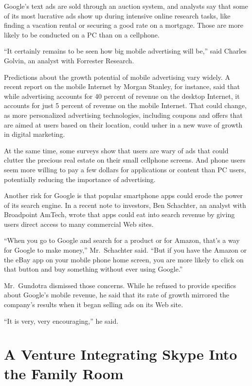 ﻿\documentclass[12pt]{article}
\begin{document}
Google's text ads are sold through an auction system, and analysts say that some of its most
lucrative ads show up during intensive online research tasks, like finding a vacation rental or
securing a good rate on a mortgage. Those are more likely to be conducted on a PC than on a
cellphone.

``It certainly remains to be seen how big mobile advertising will be,'' said Charles Golvin, an
analyst with Forrester Research.

Predictions about the growth potential of mobile advertising vary widely. A recent report on the
mobile Internet by Morgan Stanley, for instance, said that while advertising accounts for 40 percent
of revenue on the desktop Internet, it accounts for just 5 percent of revenue on the mobile
Internet. That could change, as more personalized advertising technologies, including coupons and
offers that are aimed at users based on their location, could usher in a new wave of growth in
digital marketing.

At the same time, some surveys show that users are wary of ads that could clutter the precious real
estate on their small cellphone screens. And phone users seem more willing to pay a few dollars for
applications or content than PC users, potentially reducing the importance of advertising.

Another risk for Google is that popular smartphone apps could erode the power of its search engine.
In a recent note to investors, Ben Schachter, an analyst with Broadpoint AmTech, wrote that apps
could eat into search revenue by giving users direct access to many commercial Web sites.

``When you go to Google and search for a product or for Amazon, that's a way for Google to make
money,'' Mr.~Schachter said. ``But if you have the Amazon or the eBay app on your mobile phone home
screen, you are more likely to click on that button and buy something without ever using Google.''

Mr.~Gundotra dismissed those concerns. While he refused to provide specifics about Google's mobile
revenue, he said that its rate of growth mirrored the company's results when it began selling ads on
its Web site.

``It is very, very encouraging,'' he said.

\section{A Venture Integrating Skype Into the Family Room}
\end{document}
